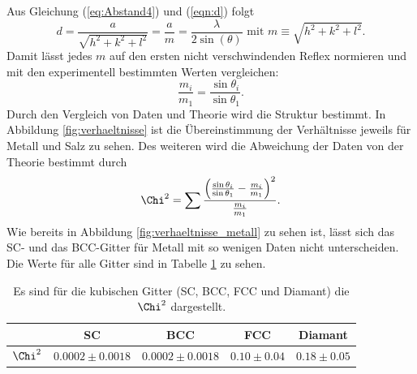 Aus Gleichung (\ref{eq:Abstand4}) und (\ref{eqn:d}) folgt
\begin{equation*}
	d = \frac{a}{\sqrt{h^2 + k ^2 + l^2}} = \frac{a}{m} = \frac{\lambda}{2\sin(\theta)} \text{ mit }m\equiv\sqrt{h^2 + k ^2 + l^2}.
\end{equation*}
Damit lässt jedes $m$ auf den ersten nicht verschwindenden Reflex normieren und mit den experimentell bestimmten Werten vergleichen:
\begin{equation*}
	\frac{m_i}{m_1} = \frac{\sin{\theta_i}}{\sin{\theta_1}}.
\end{equation*}
Durch den Vergleich von Daten und Theorie wird die Struktur bestimmt. In Abbildung \ref{fig:verhaeltnisse} ist die Übereinstimmung der Verhältnisse jeweils für Metall und Salz zu sehen. Des weiteren wird die Abweichung der Daten von der Theorie bestimmt durch
\begin{equation*}
	\Chi^2 = \sum\frac{\left(\frac{\sin{\theta_i}}{\sin{\theta_1}} - \frac{m_i}{m_1}\right)^2}{\frac{m_i}{m_1}}.
\end{equation*}
Wie bereits in Abbildung \ref{fig:verhaeltnisse_metall} zu sehen ist, lässt sich das SC- und das BCC-Gitter für Metall mit so wenigen Daten nicht unterscheiden. Die Werte für alle Gitter sind in Tabelle \ref{tab:Xi} zu sehen.
%
\begin{table}[h]
\centering
\caption{Es sind für die kubischen Gitter (SC, BCC, FCC und Diamant) die $\Chi^2$ dargestellt.}
\label{tab:Xi}
\begin{tabular}{c | c | c | c | c}
		\hline
		& SC & BCC & FCC & Diamant \\
		\hline
		$\Chi^2$ & $0.0002\pm0.0018$ & $0.0002\pm0.0018$ & $0.10\pm0.04$ & $0.18\pm0.05$ \\
		\hline
\end{tabular}
\end{table}
%
